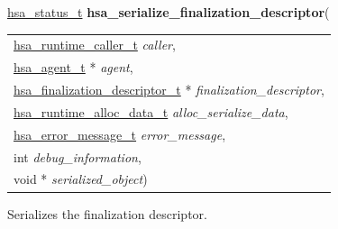 \documentclass[final]{book}
\newcommand{\hsaarg}[1]{\textit{#1}}
\begin{document}
\begin{appendices}
\noindent\begin{tcolorbox}[breakable,nobeforeafter,colframe=white,colback=lightgray,left=0mm]
\hyperlink{group--status-1gad755322e7ff95456520e8abdbe90d225}{hsa_status_t} \hypertarget{group--FinalizerCoreApi-1ga065b12ed3b2df985d3c7b3b70cd7e3e0}{\textbf{hsa_serialize_finalization_descriptor}}(
\vspace{-3.5mm}\begin{longtable}{@{}p{\textwidth}}
\hspace{1.7em}\hyperlink{group--RuntimeCommon-1ga7d9b1191602415f5dd3893985cc93826}{hsa_runtime_caller_t} \hsaarg{caller},\\
\hspace{1.7em}\hyperlink{group--topology-1gab8db3fb886332a24acac08ec361e1d86}{hsa_agent_t} * \hsaarg{agent},\\
\hspace{1.7em}\hyperlink{group--FinalizerCoreApi-1ga1f7f93c63b221fc5f3e0e16c615f7c05}{hsa_finalization_descriptor_t} * \hsaarg{finalization_descriptor},\\
\hspace{1.7em}\hyperlink{group--RuntimeCommon-1gabd2ff48bd8e2fec466eb5b561e07fec7}{hsa_runtime_alloc_data_t} \hsaarg{alloc_serialize_data},\\
\hspace{1.7em}\hyperlink{group--FinalizerCoreApi-1ga0105dcb4254850e0ec03d44fc54e11b8}{hsa_error_message_t} \hsaarg{error_message},\\
\hspace{1.7em}int \hsaarg{debug_information},\\
\hspace{1.7em}void * \hsaarg{serialized_object})\end{longtable}

\end{tcolorbox}
Serializes the finalization descriptor.


\end{appendices}
\end{document}
